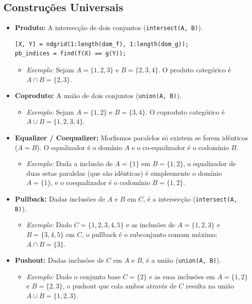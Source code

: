 \documentclass[11pt,a4paper]{article}
\begin{document}
\subsection{Construções Universais}
\begin{itemize}
    \item \textbf{Produto:} A intersecção de dois conjuntos (\texttt{intersect(A, B)}).
\begin{lstlisting}
[X, Y] = ndgrid(1:length(dom_f), 1:length(dom_g));
pb_indices = find(f(X) == g(Y));
\end{lstlisting}
    \begin{itemize}
        \item \textit{Exemplo:} Sejam \(A = \{1, 2, 3\}\) e \(B = \{2, 3, 4\}\). O produto categórico é \(A \cap B = \{2, 3\}\).
    \end{itemize}
    
    \item \textbf{Coproduto:} A união de dois conjuntos (\texttt{union(A, B)}).
    \begin{itemize}
        \item \textit{Exemplo:} Sejam \(A = \{1, 2\}\) e \(B = \{3, 4\}\). O coproduto categórico é \(A \cup B = \{1, 2, 3, 4\}\).
    \end{itemize}
    
    \item \textbf{Equalizer / Coequalizer:} Morfismos paralelos só existem se forem idênticos ($A = B$). O equalizador é o domínio $A$ e o co-equalizador é o codomínio $B$.
    \begin{itemize}
        \item \textit{Exemplo:} Dada a inclusão de \(A = \{1\}\) em \(B = \{1, 2\}\), o equalizador de duas setas paralelas (que são idênticas) é simplesmente o domínio \(A = \{1\}\), e o coequalizador é o codomínio \(B = \{1, 2\}\).
    \end{itemize}
    
    \item \textbf{Pullback:} Dadas inclusões de $A$ e $B$ em $C$, é a intersecção (\texttt{intersect(A, B)}).
    \begin{itemize}
        \item \textit{Exemplo:} Dado \(C = \{1, 2, 3, 4, 5\}\) e as inclusões de \(A = \{1, 2, 3\}\) e \(B = \{3, 4, 5\}\) em \(C\), o pullback é o subconjunto comum máximo: \(A \cap B = \{3\}\).
    \end{itemize}
    
    \item \textbf{Pushout:} Dadas inclusões de $C$ em $A$ e $B$, é a união (\texttt{union(A, B)}).
    \begin{itemize}
        \item \textit{Exemplo:} Dado o conjunto base \(C = \{2\}\) e as suas inclusões em \(A = \{1, 2\}\) e \(B = \{2, 3\}\), o pushout que cola ambos através de \(C\) resulta na união \(A \cup B = \{1, 2, 3\}\).
    \end{itemize}
\end{itemize}
\newpage
\end{document}
